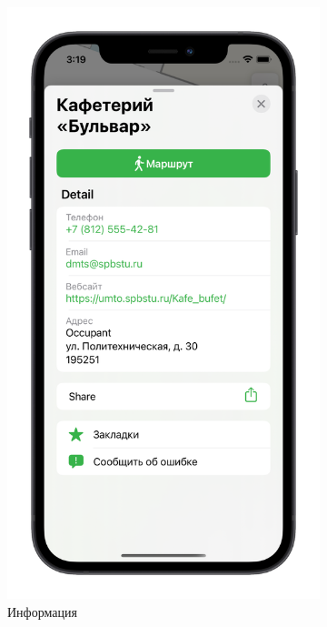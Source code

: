 \begin{figure}[H]
\begin{subfigure}[b]{0.3\textwidth}
      \centering
      \includegraphics[width=\textwidth]{assets/appendix/ios-result/info.png}
      \caption{Информация}
    \end{subfigure}
    \hfill
    \begin{subfigure}[b]{0.3\textwidth}
      \centering

\end{subfigure}
\end{figure}

